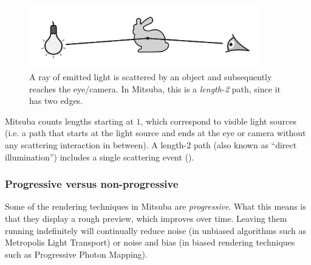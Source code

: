 \begin{figure}[h!]
\centering
\vspace{-5mm}
\includegraphics[width=10cm]{images/path_explanation.pdf}
\vspace{-5mm}
\caption{
	\label{fig:path-explanation}
	A ray of emitted light is scattered by an object and subsequently 
	reaches the eye/camera.
	In Mitsuba, this is a \emph{length-2} path, since it has two edges.
}
\end{figure}
Mitsuba counts lengths starting at $1$, which correspond to
visible light sources (i.e. a path that starts at the light 
source and ends at the eye or camera without any scattering 
interaction in between).
A length-$2$ path (also known as ``direct illumination'') includes
a single scattering event ().

\subsubsection*{Progressive versus non-progressive}
Some of the rendering techniques in Mitsuba are \emph{progressive}.
What this means is that they display a rough preview, which improves over time. 
Leaving them running indefinitely will continually reduce noise (in unbiased algorithms
such as Metropolis Light Transport) or noise and bias (in biased 
rendering techniques such as Progressive Photon Mapping).
